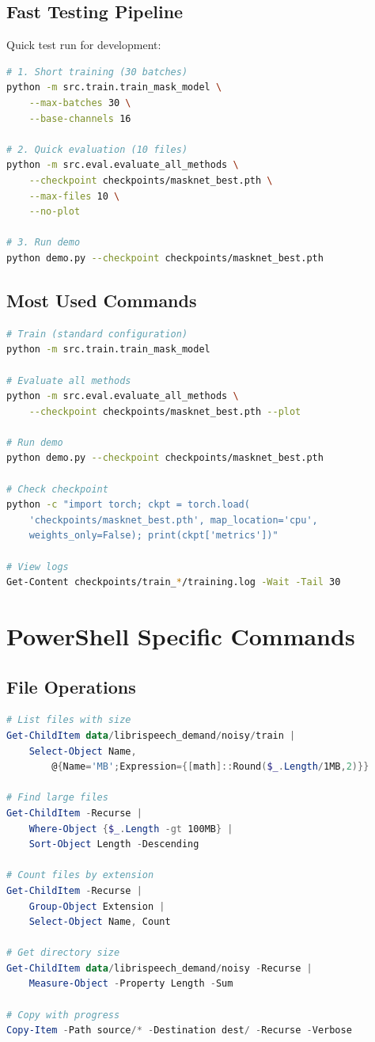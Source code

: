 \documentclass[12pt,a4paper]{article}
\begin{document}
\subsection{Fast Testing Pipeline}

Quick test run for development:

\begin{lstlisting}[language=bash]
# 1. Short training (30 batches)
python -m src.train.train_mask_model \
    --max-batches 30 \
    --base-channels 16

# 2. Quick evaluation (10 files)
python -m src.eval.evaluate_all_methods \
    --checkpoint checkpoints/masknet_best.pth \
    --max-files 10 \
    --no-plot

# 3. Run demo
python demo.py --checkpoint checkpoints/masknet_best.pth
\end{lstlisting}

\subsection{Most Used Commands}

\begin{lstlisting}[language=bash]
# Train (standard configuration)
python -m src.train.train_mask_model

# Evaluate all methods
python -m src.eval.evaluate_all_methods \
    --checkpoint checkpoints/masknet_best.pth --plot

# Run demo
python demo.py --checkpoint checkpoints/masknet_best.pth

# Check checkpoint
python -c "import torch; ckpt = torch.load(
    'checkpoints/masknet_best.pth', map_location='cpu', 
    weights_only=False); print(ckpt['metrics'])"

# View logs
Get-Content checkpoints/train_*/training.log -Wait -Tail 30
\end{lstlisting}

\section{PowerShell Specific Commands}

\subsection{File Operations}

\begin{lstlisting}[language=powershell]
# List files with size
Get-ChildItem data/librispeech_demand/noisy/train | 
    Select-Object Name, 
        @{Name='MB';Expression={[math]::Round($_.Length/1MB,2)}}

# Find large files
Get-ChildItem -Recurse | 
    Where-Object {$_.Length -gt 100MB} | 
    Sort-Object Length -Descending

# Count files by extension
Get-ChildItem -Recurse | 
    Group-Object Extension | 
    Select-Object Name, Count

# Get directory size
Get-ChildItem data/librispeech_demand/noisy -Recurse | 
    Measure-Object -Property Length -Sum

# Copy with progress
Copy-Item -Path source/* -Destination dest/ -Recurse -Verbose
\end{lstlisting}
\end{document}
